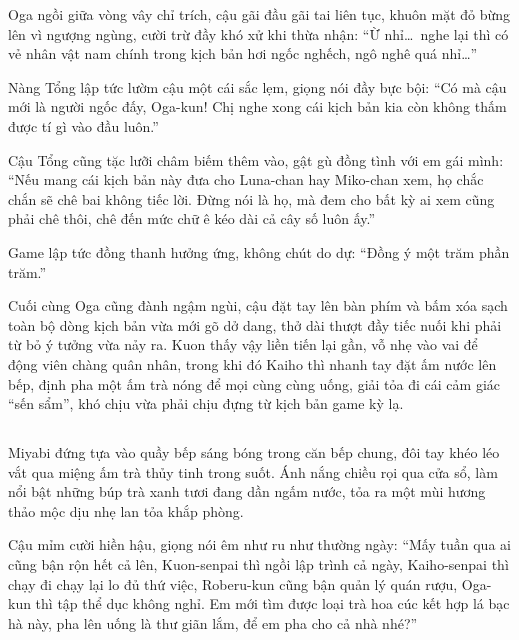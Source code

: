\documentclass[../main.tex]{subfiles}
\begin{document}
Oga ngồi giữa vòng vây chỉ trích, cậu gãi đầu gãi tai liên tục, khuôn mặt đỏ bừng lên vì ngượng ngùng, cười trừ đầy khó xử khi thừa nhận: ``Ừ nhỉ\dots\ nghe lại thì có vẻ nhân vật nam chính trong kịch bản hơi ngốc nghếch, ngô nghê quá nhỉ\dots''

Nàng Tổng lập tức lườm cậu một cái sắc lẹm, giọng nói đầy bực bội: ``Có mà cậu mới là người ngốc đấy, Oga-kun! Chị nghe xong cái kịch bản kia còn không thấm được tí gì vào đầu luôn.''

Cậu Tổng cũng tặc lưỡi châm biếm thêm vào, gật gù đồng tình với em gái mình: ``Nếu mang cái kịch bản này đưa cho Luna-chan hay Miko-chan xem, họ chắc chắn sẽ chê bai không tiếc lời. Đừng nói là họ, mà đem cho bất kỳ ai xem cũng phải chê thôi, chê đến mức chữ ê kéo dài cả cây số luôn ấy.''

Game lập tức đồng thanh hưởng ứng, không chút do dự: ``Đồng ý một trăm phần trăm.''

Cuối cùng Oga cũng đành ngậm ngùi, cậu đặt tay lên bàn phím và bấm xóa sạch toàn bộ dòng kịch bản vừa mới gõ dở dang, thở dài thượt đầy tiếc nuối khi phải từ bỏ ý tưởng vừa nảy ra. Kuon thấy vậy liền tiến lại gần, vỗ nhẹ vào vai để động viên chàng quân nhân, trong khi đó Kaiho thì nhanh tay đặt ấm nước lên bếp, định pha một ấm trà nóng để mọi cùng cùng uống, giải tỏa đi cái cảm giác ``sến sẩm'', khó chịu vừa phải chịu đựng từ kịch bản game kỳ lạ.

\newpage

\omk

\subsection*{\label{ep-M8.VI}}
\vspace{-4pt}

Miyabi đứng tựa vào quầy bếp sáng bóng trong căn bếp chung, đôi tay khéo léo vắt qua miệng ấm trà thủy tinh trong suốt. Ánh nắng chiều rọi qua cửa sổ, làm nổi bật những búp trà xanh tươi đang dần ngấm nước, tỏa ra một mùi hương thảo mộc dịu nhẹ lan tỏa khắp phòng.

Cậu mỉm cười hiền hậu, giọng nói êm như ru như thường ngày: ``Mấy tuần qua ai cũng bận rộn hết cả lên, Kuon-senpai thì ngồi lập trình cả ngày, Kaiho-senpai thì chạy đi chạy lại lo đủ thứ việc, Roberu-kun cũng bận quản lý quán rượu, Oga-kun thì tập thể dục không nghỉ. Em mới tìm được loại trà hoa cúc kết hợp lá bạc hà này, pha lên uống là thư giãn lắm, để em pha cho cả nhà nhé?''
\end{document}
